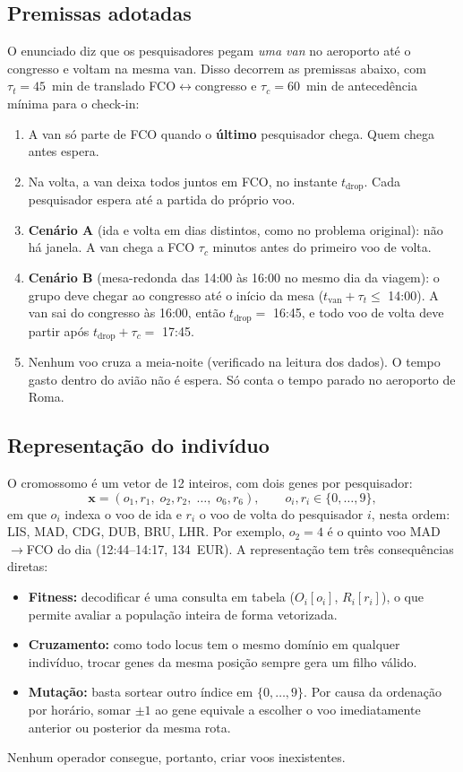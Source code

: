 \documentclass[conference]{IEEEtran}
\begin{document}
\subsection{Premissas adotadas}
\label{sec:a1_premissas}
O enunciado diz que os pesquisadores pegam \emph{uma van} no aeroporto até o congresso e voltam na mesma van. Disso decorrem as premissas abaixo, com $\tau_t=45$~min de translado FCO$\leftrightarrow$congresso e $\tau_c=60$~min de antecedência mínima para o check-in:
\begin{enumerate}
\item[P1)] A van só parte de FCO quando o \textbf{último} pesquisador chega. Quem chega antes espera.
\item[P2)] Na volta, a van deixa todos juntos em FCO, no instante $t_{\text{drop}}$. Cada pesquisador espera até a partida do próprio voo.
\item[P3)] \textbf{Cenário A} (ida e volta em dias distintos, como no problema original): não há janela. A van chega a FCO $\tau_c$ minutos antes do primeiro voo de volta.
\item[P4)] \textbf{Cenário B} (mesa-redonda das 14:00 às 16:00 no mesmo dia da viagem): o grupo deve chegar ao congresso até o início da mesa ($t_{\text{van}}+\tau_t\le$ 14:00). A van sai do congresso às 16:00, então $t_{\text{drop}}=$ 16:45, e todo voo de volta deve partir após $t_{\text{drop}}+\tau_c=$ 17:45.
\item[P5)] Nenhum voo cruza a meia-noite (verificado na leitura dos dados). O tempo gasto dentro do avião não é espera. Só conta o tempo parado no aeroporto de Roma.
\end{enumerate}

\subsection{Representação do indivíduo}
O cromossomo é um vetor de 12 inteiros, com dois genes por pesquisador:
\begin{equation}
\mathbf{x}=(o_1,r_1,\;o_2,r_2,\;\dots,\;o_6,r_6),\qquad o_i,r_i\in\{0,\dots,9\},
\end{equation}
em que $o_i$ indexa o voo de ida e $r_i$ o voo de volta do pesquisador $i$, nesta ordem: LIS, MAD, CDG, DUB, BRU, LHR. Por exemplo, $o_2=4$ é o quinto voo MAD$\to$FCO do dia (12:44--14:17, 134~EUR). A representação tem três consequências diretas:
\begin{itemize}
  \item \textbf{Fitness:} decodificar é uma consulta em tabela ($O_i[o_i]$, $R_i[r_i]$), o que permite avaliar a população inteira de forma vetorizada.
  \item \textbf{Cruzamento:} como todo locus tem o mesmo domínio em qualquer indivíduo, trocar genes da mesma posição sempre gera um filho válido.
  \item \textbf{Mutação:} basta sortear outro índice em $\{0,\dots,9\}$. Por causa da ordenação por horário, somar $\pm1$ ao gene equivale a escolher o voo imediatamente anterior ou posterior da mesma rota.
\end{itemize}
Nenhum operador consegue, portanto, criar voos inexistentes.
\end{document}

